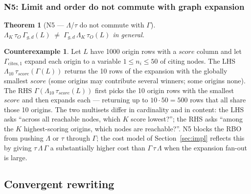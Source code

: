 \documentclass[acmsmall,review,anonymous]{acmart}
\theoremstyle{plain}
\newtheorem{theorem}{Theorem}
\theoremstyle{definition}
\newtheorem{counterexample}{Counterexample}
\theoremstyle{remark}
\begin{document}
\subsubsection{N5: Limit and order do not commute with graph expansion}

\begin{theorem}[N5 --- $\Lambda$/$\tau$ do not commute with $\Gamma$]\label{thm:n5}
$\Lambda_K\, \tau_O\, \Gamma_{g, d}(L) \;\neq\;
\Gamma_{g, d}\, \Lambda_K\, \tau_O(L)$ in general.
\end{theorem}

\begin{counterexample}\label{ce:n5}
Let $L$ have 1000 origin rows with a $\mathit{score}$ column
and let $\Gamma_{\mathrm{cites},1}$ expand each origin to a
variable $1 \leq n_i \leq 50$ of citing nodes. The LHS
$\Lambda_{10}\, \tau_{\mathit{score}}(\Gamma(L))$ returns
the 10 rows of the expansion with the globally smallest
$\mathit{score}$ (some origins may contribute several
winners; some origins none). The RHS
$\Gamma(\Lambda_{10}\, \tau_{\mathit{score}}(L))$ first picks
the 10 origin rows with the smallest $\mathit{score}$ and
then expands each --- returning up to $10 \cdot 50 = 500$
rows that all share those 10 origins. The two multisets
differ in cardinality and in content: the LHS asks ``across
all reachable nodes, which $K$ score lowest?''; the RHS
asks ``among the $K$ highest-scoring origins, which nodes
are reachable?''. N5 blocks the RBO from pushing $\Lambda$
or $\tau$ through $\Gamma$; the cost model of
Section~\ref{sec:impl} reflects this by giving
$\tau\, \Lambda\, \Gamma$ a substantially higher cost than
$\Gamma\, \tau\, \Lambda$ when the expansion fan-out is large.
\end{counterexample}

\subsection{Convergent rewriting}\label{sec:equational:convergent}
\end{document}
